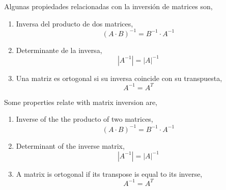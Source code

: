 \begin{paracol}{2}
Algunas propiedades relacionadas con la inversión de matrices son,
\begin{enumerate}
\item Inversa del producto de dos matrices,
\begin{equation*}
(A\cdot B)^{-1}=B^{-1}\cdot A^{-1}
\end{equation*}

\item Determinante de la inversa,
\begin{equation*}
\left\vert A^{-1} \right\vert = \vert A \vert ^{-1}
\end{equation*}

\item Una matriz es ortogonal si su inversa coincide con su transpuesta,
\begin{equation*}
A^{-1}=A^T
\end{equation*}
\end{enumerate}
\switchcolumn
Some properties relate with matrix inversion are,
\begin{enumerate}
	\item Inverse of the the producto of two matrices,
	\begin{equation*}
		(A\cdot B)^{-1}=B^{-1}\cdot A^{-1}
	\end{equation*}
	
	\item Determinant of the inverse matrix,
	\begin{equation*}
		\left\vert A^{-1} \right\vert = \vert A \vert ^{-1}
	\end{equation*}
	
	\item A matrix is ortogonal if its transpose is equal to its inverse,
	\begin{equation*}
		A^{-1}=A^T
	\end{equation*}
\end{enumerate}
\end{paracol}

